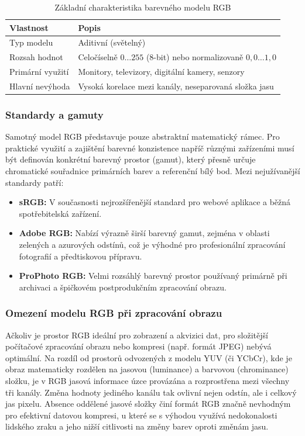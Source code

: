 \documentclass[FM,DP]{tulthesis}
\begin{document}
\begin{table}[htbp]
    \centering
    \caption{Základní charakteristika barevného modelu RGB}
    \label{tab:rgb_vlastnosti}
    \begin{tabular}{@{}ll@{}}
        \toprule
        \textbf{Vlastnost} & \textbf{Popis}                                                   \\ \midrule
        Typ modelu         & Aditivní (světelný)                                              \\
        Rozsah hodnot      & Celočíselně $0\dots255$ (8-bit) nebo normalizovaně $0,0\dots1,0$ \\
        Primární využití   & Monitory, televizory, digitální kamery, senzory                  \\
        Hlavní nevýhoda    & Vysoká korelace mezi kanály, neseparovaná složka jasu            \\ \bottomrule
    \end{tabular}
\end{table}

\subsubsection*{Standardy a gamuty}
Samotný model RGB představuje pouze abstraktní matematický rámec. Pro praktické využití a zajištění barevné konzistence napříč různými zařízeními musí být definován konkrétní barevný prostor (gamut), který přesně určuje chromatické souřadnice primárních barev a referenční bílý bod. Mezi nejužívanější standardy patří:
\begin{itemize}
    \item \textbf{sRGB:} V současnosti nejrozšířenější standard pro webové aplikace a běžná spotřebitelská zařízení.
    \item \textbf{Adobe RGB:} Nabízí výrazně širší barevný gamut, zejména v oblasti zelených a azurových odstínů, což je výhodné pro profesionální zpracování fotografií a předtiskovou přípravu.
    \item \textbf{ProPhoto RGB:} Velmi rozsáhlý barevný prostor používaný primárně při archivaci a špičkovém postprodukčním zpracování obrazu.
\end{itemize}

\subsubsection*{Omezení modelu RGB při zpracování obrazu}
Ačkoliv je prostor RGB ideální pro zobrazení a akvizici dat, pro složitější počítačové zpracování obrazu nebo kompresi (např. formát JPEG) nebývá optimální. Na rozdíl od prostorů odvozených z modelu YUV (či YCbCr), kde je obraz matematicky rozdělen na jasovou (luminance) a barvovou (chrominance) složku, je v RGB jasová informace úzce provázána a rozprostřena mezi všechny tři kanály. Změna hodnoty jediného kanálu tak ovlivní nejen odstín, ale i celkový jas pixelu. Absence oddělené jasové složky činí formát RGB značně nevhodným pro efektivní datovou kompresi, u které se s výhodou využívá nedokonalosti lidského zraku a jeho nižší citlivosti na změny barev oproti změnám jasu.
\end{document}
